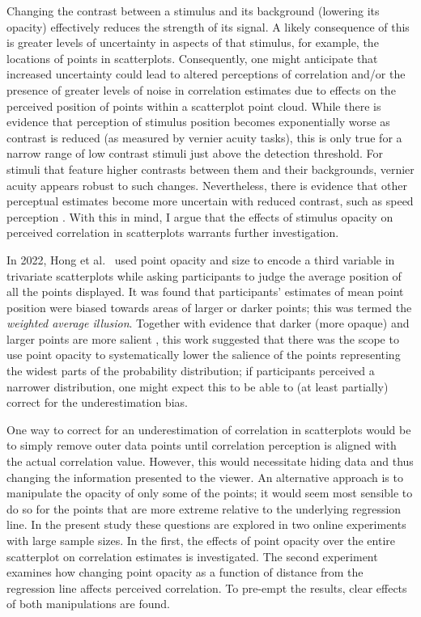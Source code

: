 \documentclass[../main.tex]{subfiles}
\begin{document}
Changing the contrast between a stimulus and its background (lowering
its opacity) effectively reduces the strength of its signal. A likely
consequence of this is greater levels of uncertainty in aspects of that
stimulus, for example, the locations of points in scatterplots.
Consequently, one might anticipate that increased uncertainty could lead
to altered perceptions of correlation and/or the presence of greater
levels of noise in correlation estimates due to effects on the perceived
position of points within a scatterplot point cloud. While there is
evidence \cite{wehrhahn_1990} that perception of stimulus position
becomes exponentially worse as contrast is reduced (as measured by
vernier acuity tasks), this is only true for a narrow range of low
contrast stimuli just above the detection threshold. For stimuli that
feature higher contrasts between them and their backgrounds, vernier
acuity appears robust to such changes. Nevertheless, there is evidence
that other perceptual estimates become more uncertain with reduced
contrast, such as speed perception \cite{champion_2017}. With this in
mind, I argue that the effects of stimulus opacity on perceived
correlation in scatterplots warrants further investigation.

In 2022, Hong et al.~\cite{hong_2022} used point opacity and size to
encode a third variable in trivariate scatterplots while asking
participants to judge the average position of all the points displayed.
It was found that participants' estimates of mean point position were
biased towards areas of larger or darker points; this was termed the
\emph{weighted average illusion}. Together with evidence that darker
(more opaque) and larger points are more salient \cite{healey_2012},
this work suggested that there was the scope to use point opacity to
systematically lower the salience of the points representing the widest
parts of the probability distribution; if participants perceived a
narrower distribution, one might expect this to be able to (at least
partially) correct for the underestimation bias.

One way to correct for an underestimation of correlation in scatterplots
would be to simply remove outer data points until correlation perception
is aligned with the actual correlation value. However, this would
necessitate hiding data and thus changing the information presented to
the viewer. An alternative approach is to manipulate the opacity of only
some of the points; it would seem most sensible to do so for the points
that are more extreme relative to the underlying regression line. In the
present study these questions are explored in two online experiments
with large sample sizes. In the first, the effects of point opacity over
the entire scatterplot on correlation estimates is investigated. The
second experiment examines how changing point opacity as a function of
distance from the regression line affects perceived correlation. To
pre-empt the results, clear effects of both manipulations are found.
\end{document}
